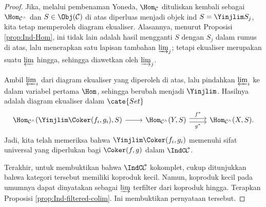 \begin{proof}
	Jika, melalui pembenaman Yoneda, $\Hom_{\mathcal{C}}$ dituliskan kembali sebagai $\Hom_{\mathcal{C}^\wedge}$ dan $S \in \Obj(\mathcal{C})$ di atas diperluas menjadi objek ind $S = \Yinjlim S_j$, kita tetap memperoleh diagram ekualiser. Alasannya, menurut Proposisi \ref{prop:Ind-Hom}, ini tidak lain adalah hasil mengganti $S$ dengan $S_j$ dalam rumus di atas, lalu menerapkan satu lapisan tambahan $\varinjlim_j$; tetapi ekualiser merupakan suatu $\varprojlim$ hingga, sehingga diawetkan oleh $\varinjlim_j$.
	
	Ambil $\varprojlim_i$ dari diagram ekualiser yang diperoleh di atas, lalu pindahkan $\varprojlim_i$ ke dalam variabel pertama $\Hom$, sehingga berubah menjadi $\Yinjlim$. Hasilnya adalah diagram ekualiser dalam $\cate{Set}$
	\[\begin{tikzcd}
		\Hom_{\mathcal{C}^\wedge}(\Yinjlim \Coker(f_i, g_i), S) \arrow[r] &
		\Hom_{\mathcal{C}^\wedge}(Y, S) \arrow[r, shift left, "{f^*}"] \arrow[r, shift right, "{g^*}"'] & \Hom_{\mathcal{C}^\wedge}(X, S).
	\end{tikzcd}\]
	Jadi, kita telah memeriksa bahwa $\Yinjlim \Coker(f_i, g_i)$ memenuhi sifat universal yang diperlukan bagi $\Coker(f, g)$ dalam $\IndC\mathcal{C}$.
	
	Terakhir, untuk membuktikan bahwa $\IndC\mathcal{C}$ kokomplet, cukup ditunjukkan bahwa kategori tersebut memiliki koproduk kecil. Namun, koproduk kecil pada umumnya dapat dinyatakan sebagai $\varinjlim$ terfilter dari koproduk hingga. Terapkan Proposisi \ref{prop:Ind-filtered-colim}. Ini membuktikan pernyataan tersebut.
\end{proof}
